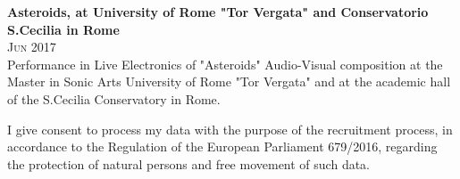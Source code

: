 \documentclass[oneside]{article}
\begin{document}
{\begin{minipage}[t][\dimexpr\textheight-2\fboxrule-2\fboxsep\relax][t]{\dimexpr0.6\textwidth-2\fboxrule-2\fboxsep\relax}
        \begin{justify}
            \setlength{\parindent}{0pt}
            {\large \textbf{Asteroids, at University of Rome "Tor Vergata" and Conservatorio S.Cecilia in Rome}} \\
            {\scshape{}\selectfont\footnotesize \qquad Jun 2017} \\
            \small
            Performance in Live Electronics of "Asteroids" Audio-Visual composition at the Master in Sonic Arts
            University of Rome "Tor Vergata" and at the academic hall of the S.Cecilia Conservatory in Rome. \\
            \end{justify}

        \vfill%
        \scriptsize I give consent to process my data with the purpose of the recruitment process, in accordance to the Regulation of the European
        Parliament 679/2016, regarding the protection of natural persons and free movement of such data.
    \end{minipage}
}%
\let\cleardoublepage\clearpage
\end{document}

